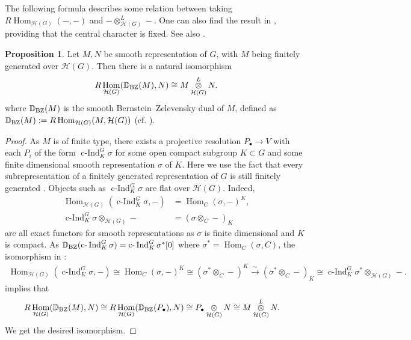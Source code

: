 \documentclass{article}
\theoremstyle{definition}
\newtheorem{proposition}[theorem]{Proposition}
\def\calH{\mathcal{H}}
\def\bbD{\mathbb{D}}
\DeclareMathOperator{\ox}{\otimes}
\def\isom{\cong}
\def\aisom{\xrightarrow{\sim}}
\DeclareMathOperator{\Hom}{Hom}
\DeclareMathOperator{\Ind}{Ind}
\DeclareMathOperator{\cInd}{\text{c-}\Ind}
\begin{document}
The following formula describes some relation between taking $R\Hom_{\calH(G)}(-,-)$ and $-\otimes_{\calH(G)}^L-$. One can also find the result in \cite[\S III.3, Duality theorem]{schneider1997representation}, providing that the central character is fixed. See also \cite[Theorem V.5.1]{fargues2024geometrizationlocallanglandscorrespondence}.
\begin{proposition}\label{prop:HGLoxRHom}
Let $M,N$ be smooth representation of $G$, with $M$ being finitely generated over $\calH(G)$. Then there is a natural isomorphism 
\begin{align*}
    R\Hom_{\calH(G)}(\bbD_{\rm BZ}(M),N)\isom M\ox^L_{\calH(G)}N.
\end{align*}
where $\bbD_{\rm BZ}(M)$ is the smooth Bernstein--Zelevensky dual of $M$, defined as $\bbD_{\rm BZ}(M):=R\Hom_{\calH(G)}(M,\calH(G))$ (cf. \cite[IV.5]{bernstein1992notes}).
\begin{proof}
As $M$ is of finite type, there exists a projective resolution $P_{\bullet}\to V$ with each $P_i$ of the form $\cInd^G_K \sigma$ for some open compact subgroup $K\subset G$ and some finite dimensional smooth representation $\sigma$ of $K$. Here we use the fact that every subrepresentation of a finitely generated representation of $G$ is still finitely generated \cite[Proposition 32]{bernstein1992notes}. Objects such as $\cInd^G_K \sigma$ are flat over $\calH(G)$. Indeed, 
\begin{align*}
    \Hom_{\calH(G)}(\cInd^G_K\sigma,-)&=\Hom_C(\sigma,-)^K,\\
    \cInd^G_K\sigma\ox_{\calH(G)}-&=(\sigma\ox_C-)_K
\end{align*}
are all exact functors for smooth representations as $\sigma$ is finite dimensional and $K$ is compact. As $\bbD_{\rm BZ}(\cInd^G_K\sigma)=\cInd^G_K\sigma^{*}[0]$ where $\sigma^*=\Hom_C(\sigma,C)$, the isomorphism in \cite[Lemma 8.4]{mantovan2004certain}:
\begin{align*}
    \Hom_{\calH(G)}(\cInd^G_K\sigma,-)\isom \Hom_C(\sigma,-)^K\isom (\sigma^*\ox_C-)^K\aisom (\sigma^*\ox_C-)_K\isom \cInd^G_K\sigma^*\ox_{\calH(G)}-.
\end{align*}
implies that
\begin{align*}
    R\Hom_{\calH(G)}(\bbD_{\rm BZ}(M),N)&\isom R\Hom_{\calH(G)}(\bbD_{\rm BZ}(P_{\bullet}),N)\isom P_{\bullet}\ox_{\calH(G)}N\isom M\ox_{\calH(G)}^LN.
\end{align*}
We get the desired isomorphism.
\end{proof}
\end{proposition}
\end{document}
